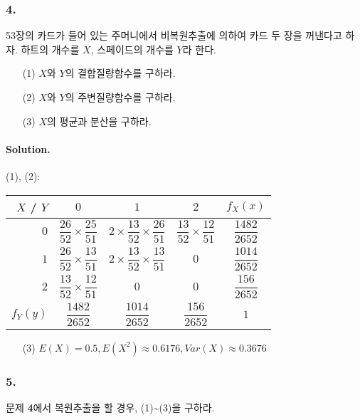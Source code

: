 \subsubsection{4.} 53장의 카드가 들어 있는 주머니에서 비복원추출에 의하여 카드 두 장을 꺼낸다고 하자. 하트의 개수를 $X$, 스페이드의 개수를 $Y$라 한다.

\begin{itemize}
  \item [(1)] $X$와 $Y$의 결합질량함수를 구하라.
  \item [(2)] $X$와 $Y$의 주변질량함수를 구하라.
  \item [(3)] $X$의 평균과 분산을 구하라.
\end{itemize}

\paragraph{Solution.} (1), (2):

\begin{center}
	\begin{tabular}{r|c|c|c|c}
		$X$ / $Y$ & $0$ & $1$ & $2$ & $f_X\left(x\right)$ \\
		\hline
		$0$ & $\dfrac{26}{52}\times \dfrac{25}{51}$ & $2\times \dfrac{13}{52}\times \dfrac{26}{51}$ & $\dfrac{13}{52}\times \dfrac{12}{51}$ & $\dfrac{1482}{2652}$ \\
		\hline
		$1$ & $\dfrac{26}{52}\times \dfrac{13}{51}$ & $2\times \dfrac{13}{52}\times \dfrac{13}{51}$ & $0$ & $\dfrac{1014}{2652}$ \\
		\hline
		$2$ & $\dfrac{13}{52}\times \dfrac{12}{51}$ & $0$ & $0$ & $\dfrac{156}{2652}$ \\
		\hline
		$f_Y\left(y\right)$ & $\dfrac{1482}{2652}$ & $\dfrac{1014}{2652}$ & $\dfrac{156}{2652}$ & $1$ \\
	\end{tabular}
\end{center}

\begin{itemize}
  \item [(3)] $E\left(X\right) = 0.5, E\left(X^2\right) \approx 0.6176, Var\left(X\right) \approx 0.3676$
\end{itemize}

\subsubsection{5.} 문제 \textbf{4}에서 복원추출을 할 경우, (1)\textasciitilde(3)을 구하라.

